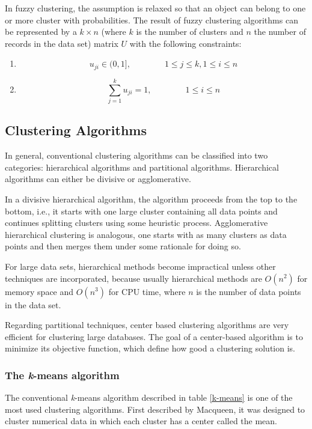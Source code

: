 \documentclass[a4paper,12pt,english]{report}
\begin{document}
In fuzzy clustering, the assumption is relaxed so that an object can belong to one or more cluster with probabilities. The result of fuzzy clustering algorithms can be represented by a $k \times n$ (where $k$ is the number of clusters and $n$ the number of records in the data set) matrix $U$ with the following constraints:
\begin{enumerate}
\item
$$u_{ji} \in (0,1], \qquad \qquad   1 \leq j \leq k, 1 \leq i \leq n$$
\item
$$\sum_{j=1}^{k} u_{ji} = 1, \qquad \qquad  1 \leq i  \leq n$$
\end{enumerate}

\subsection{Clustering Algorithms}

In general, conventional clustering algorithms can be classified into two categories: hierarchical algorithms and partitional algorithms. Hierarchical algorithms can either be divisive or agglomerative.

In a divisive hierarchical algorithm, the algorithm proceeds from the top to the bottom, i.e., it starts with one large cluster containing all data points and continues splitting clusters using some heuristic process.  Agglomerative hierarchical clustering is analogous, one starts with as many clusters as data points and then merges them under some rationale for doing so.

For large data sets, hierarchical methods become impractical unless other techniques are incorporated, because usually hierarchical methods are $O(n^2)$ for memory space and $O(n^3)$ for CPU time\cite{zait}, where $n$ is the number of data points in the data set.

Regarding partitional techniques, center based clustering algorithms are very efficient for clustering large databases. The goal of a center-based algorithm is to minimize its objective function, which define how good a clustering solution is.

\subsubsection{The \emph{k}-means algorithm}

The conventional \emph{k}-means algorithm described in table \ref{k-means} is one of the most used clustering algorithms. First described by Macqueen\cite{macqueen}, it was designed to cluster numerical data in which each cluster has a center called the mean.
\end{document}
